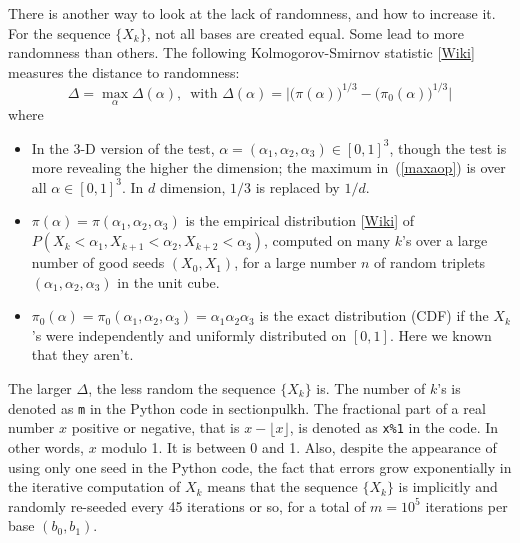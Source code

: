 \documentclass[oneside,10pt]{book}
\begin{document}
There is another way to look at the lack of randomness, and how to increase it. For the sequence $\{X_k\}$, not all bases are created equal. Some lead to more randomness than others. The following \textcolor{index}{Kolmogorov-Smirnov statistic} [\href{https://en.wikipedia.org/wiki/Kolmogorov\%E2\%80\%93Smirnov_test}{Wiki}] measures the distance to randomness:
\begin{equation}
\Delta = \max_{\alpha} \Delta(\alpha), \, \text{ with } \Delta(\alpha) = \Bigg|\Big(\pi(\alpha)\Big)^{1/3}-\Big(\pi_0(\alpha)\Big)^{1/3}\Bigg| \label{maxaop}
\end{equation}
where 
\begin{itemize}
\item In the 3-D version of the test, $\alpha=(\alpha_1,\alpha_2,\alpha_3) \in [0,1]^3$, 
though the test is more revealing the higher the dimension; the maximum in~(\ref{maxaop}) is over all $\alpha \in [0,1]^3$.
 In $d$ dimension, $1/3$ is replaced by $1/d$.
\item $\pi(\alpha)=\pi(\alpha_1,\alpha_2,\alpha_3)$ is the \textcolor{index}{empirical distribution} 
[\href{https://en.wikipedia.org/wiki/Empirical_distribution_function}{Wiki}] of $P(X_k<\alpha_1, X_{k+1}<\alpha_2,X_{k+2}<\alpha_3)$,
 computed on many $k$'s over a large number of good seeds $(X_0,X_1)$, for a large number $n$ of random triplets $(\alpha_1,\alpha_2,\alpha_3)$
 in the unit cube.
\item $\pi_0(\alpha)=\pi_0(\alpha_1,\alpha_2,\alpha_3)=\alpha_1\alpha_2\alpha_3$ is the exact distribution (CDF) if the $X_k$'s were independently 
 and uniformly distributed on $[0,1]$. Here we known that they aren't. 
\end{itemize} \vspace{1ex}
The larger $\Delta$, the less random the sequence $\{X_k\}$ is. 
The number of $k$'s is denoted as \texttt{m} in the Python code in section{pulkh}. The fractional part of a real number $x$ positive or negative, that is $x-\lfloor x\rfloor$,
 is denoted as \texttt{x\%1}  in the code. In other words, $x$ modulo 1. It is between 0 and 1. Also, despite the appearance of using only one seed in the Python code, the fact that errors grow exponentially in the iterative computation of  $X_k$ means that 
 the sequence $\{X_k\}$ is implicitly and randomly re-seeded every 45 iterations or so, for a total of $m=10^5$ iterations per base $(b_0, b_1)$.
\end{document}
